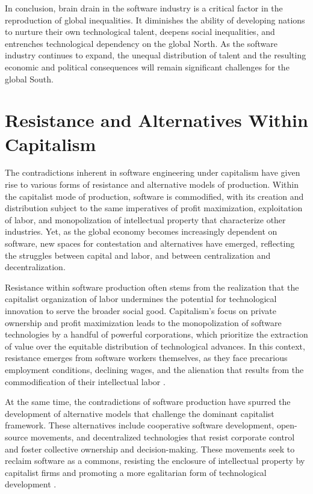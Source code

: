 \begin{refsection}
In conclusion, brain drain in the software industry is a critical factor in the reproduction of global inequalities. It diminishes the ability of developing nations to nurture their own technological talent, deepens social inequalities, and entrenches technological dependency on the global North. As the software industry continues to expand, the unequal distribution of talent and the resulting economic and political consequences will remain significant challenges for the global South.

\section{Resistance and Alternatives Within Capitalism}

The contradictions inherent in software engineering under capitalism have given rise to various forms of resistance and alternative models of production. Within the capitalist mode of production, software is commodified, with its creation and distribution subject to the same imperatives of profit maximization, exploitation of labor, and monopolization of intellectual property that characterize other industries. Yet, as the global economy becomes increasingly dependent on software, new spaces for contestation and alternatives have emerged, reflecting the struggles between capital and labor, and between centralization and decentralization.

Resistance within software production often stems from the realization that the capitalist organization of labor undermines the potential for technological innovation to serve the broader social good. Capitalism's focus on private ownership and profit maximization leads to the monopolization of software technologies by a handful of powerful corporations, which prioritize the extraction of value over the equitable distribution of technological advances. In this context, resistance emerges from software workers themselves, as they face precarious employment conditions, declining wages, and the alienation that results from the commodification of their intellectual labor \cite[pp.~45-47]{cleaver2000}.

At the same time, the contradictions of software production have spurred the development of alternative models that challenge the dominant capitalist framework. These alternatives include cooperative software development, open-source movements, and decentralized technologies that resist corporate control and foster collective ownership and decision-making. These movements seek to reclaim software as a commons, resisting the enclosure of intellectual property by capitalist firms and promoting a more egalitarian form of technological development \cite[pp.~83-86]{kling1996}.


\end{refsection}
